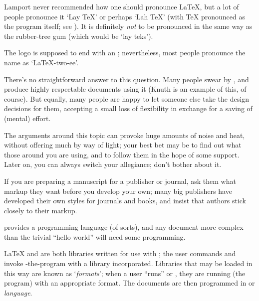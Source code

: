 
Lamport never recommended how one should pronounce \LaTeX{}, but a lot
of people pronounce it `Lay \TeX{}' or perhaps `Lah \TeX{}' (with
\TeX{} pronounced as the program itself; see
).  It is definitely
\emph{not} to be pronounced in the same way as the rubber-tree gum
(which would be `lay teks').

The \LaTeXe{} logo is supposed to end with an
; nevertheless, most
people pronounce the name as `\LaTeX{}-two-ee'.


There's no straightforward answer to this question.  Many people swear
by \plaintex{}, and produce highly respectable documents using it
(Knuth is an example of this, of course).  But equally, many people
are happy to let someone else take the design decisions for them,
accepting a small loss of flexibility in exchange for a saving of
(mental) effort.

The arguments around this topic can provoke huge amounts of noise and
heat, without offering much by way of light; your best bet may be to
find out what those around you are using, and to follow them in the
hope of some support.  Later on, you can always switch your
allegiance; don't bother about it.

If you are preparing a manuscript for a publisher or journal, ask them
what markup they want before you
develop your own; many big publishers have developed their own
\AllTeX{} styles for journals and books, and insist that authors stick
closely to their markup.


\tex{} provides a programming language (of sorts), and any document
more complex than the trivial ``hello world'' will need some
programming.

\LaTeX{} and \plaintex{} are both libraries written for use with
\tex{}; the user commands  and  invoke
\tex{}-the-program with a library incorporated.  Libraries that may be
loaded in this way are known as `\emph{formats}'; when a user ``runs''
\plaintex{} or \latex{}, they are running \tex{} (the program) with an
appropriate format.  The documents are then programmed in \plaintex{}
or \latex{} \emph{language}.

